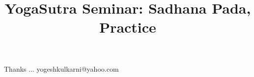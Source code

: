\documentclass[xcolor=dvipsnames,compress,t,pdf,9pt]{beamer}
\title[\insertframenumber /\inserttotalframenumber]{YogaSutra Seminar: Sadhana Pada, Practice}
\begin{document}
	\begin{frame}
	\titlepage
	\end{frame}

	

	\begin{frame}[c]{}
	Thanks ...
	\vspace{5mm}
	yogeshkulkarni@yahoo.com
	\end{frame}
\end{document}
